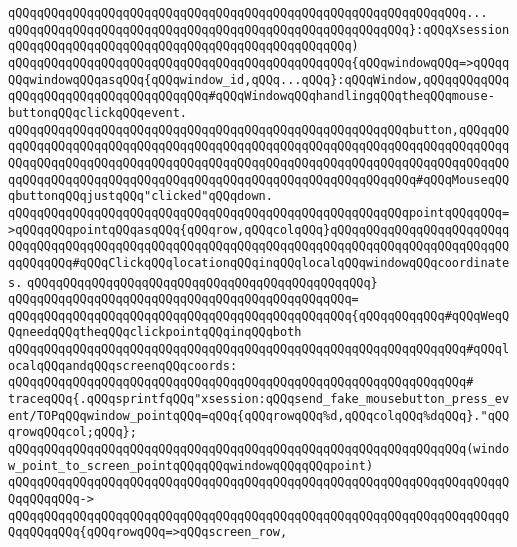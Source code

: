 \verb|qQQqqQQqqQQqqQQqqQQqqQQqqQQqqQQqqQQqqQQqqQQqqQQqqQQqqQQqqQQqqQQq...|\newline
\verb|qQQqqQQqqQQqqQQqqQQqqQQqqQQqqQQqqQQqqQQqqQQqqQQqqQQqqQQq}:qQQqXsession|\newline
\verb|qQQqqQQqqQQqqQQqqQQqqQQqqQQqqQQqqQQqqQQqqQQqqQQq)|\newline
\verb|qQQqqQQqqQQqqQQqqQQqqQQqqQQqqQQqqQQqqQQqqQQqqQQq{qQQqwindowqQQq=>qQQqqQQqwindowqQQqasqQQq{qQQqwindow_id,qQQq...qQQq}:qQQqWindow,qQQqqQQqqQQqqQQqqQQqqQQqqQQqqQQqqQQqqQQq#qQQqWindowqQQqhandlingqQQqtheqQQqmouse-buttonqQQqclickqQQqevent.|\newline
\verb|qQQqqQQqqQQqqQQqqQQqqQQqqQQqqQQqqQQqqQQqqQQqqQQqqQQqqQQqbutton,qQQqqQQqqQQqqQQqqQQqqQQqqQQqqQQqqQQqqQQqqQQqqQQqqQQqqQQqqQQqqQQqqQQqqQQqqQQqqQQqqQQqqQQqqQQqqQQqqQQqqQQqqQQqqQQqqQQqqQQqqQQqqQQqqQQqqQQqqQQqqQQqqQQqqQQqqQQqqQQqqQQqqQQqqQQqqQQqqQQqqQQqqQQqqQQqqQQqqQQqqQQq#qQQqMouseqQQqbuttonqQQqjustqQQq"clicked"qQQqdown.|\newline
\verb|qQQqqQQqqQQqqQQqqQQqqQQqqQQqqQQqqQQqqQQqqQQqqQQqqQQqqQQqpointqQQqqQQq=>qQQqqQQqpointqQQqasqQQq{qQQqrow,qQQqcolqQQq}qQQqqQQqqQQqqQQqqQQqqQQqqQQqqQQqqQQqqQQqqQQqqQQqqQQqqQQqqQQqqQQqqQQqqQQqqQQqqQQqqQQqqQQqqQQqqQQqqQQqqQQq#qQQqClickqQQqlocationqQQqinqQQqlocalqQQqwindowqQQqcoordinates.|\newline
\verb|qQQqqQQqqQQqqQQqqQQqqQQqqQQqqQQqqQQqqQQqqQQqqQQq}|\newline
\verb|qQQqqQQqqQQqqQQqqQQqqQQqqQQqqQQqqQQqqQQqqQQqqQQq=|\newline
\verb|qQQqqQQqqQQqqQQqqQQqqQQqqQQqqQQqqQQqqQQqqQQqqQQq{qQQqqQQqqQQq#qQQqWeqQQqneedqQQqtheqQQqclickpointqQQqinqQQqboth|\newline
\verb|qQQqqQQqqQQqqQQqqQQqqQQqqQQqqQQqqQQqqQQqqQQqqQQqqQQqqQQqqQQqqQQq#qQQqlocalqQQqandqQQqscreenqQQqcoords:|\newline
\verb|qQQqqQQqqQQqqQQqqQQqqQQqqQQqqQQqqQQqqQQqqQQqqQQqqQQqqQQqqQQqqQQq#|\newline
\verb|traceqQQq{.qQQqsprintfqQQq"xsession:qQQqsend_fake_mousebutton_press_event/TOPqQQqwindow_pointqQQq=qQQq{qQQqrowqQQq%d,qQQqcolqQQq%dqQQq}."qQQqrowqQQqcol;qQQq};|\newline
\verb|qQQqqQQqqQQqqQQqqQQqqQQqqQQqqQQqqQQqqQQqqQQqqQQqqQQqqQQqqQQqqQQq(window_point_to_screen_pointqQQqqQQqwindowqQQqqQQqpoint)|\newline
\verb|qQQqqQQqqQQqqQQqqQQqqQQqqQQqqQQqqQQqqQQqqQQqqQQqqQQqqQQqqQQqqQQqqQQqqQQqqQQqqQQq->|\newline
\verb|qQQqqQQqqQQqqQQqqQQqqQQqqQQqqQQqqQQqqQQqqQQqqQQqqQQqqQQqqQQqqQQqqQQqqQQqqQQqqQQq{qQQqrowqQQq=>qQQqscreen_row,|\newline
